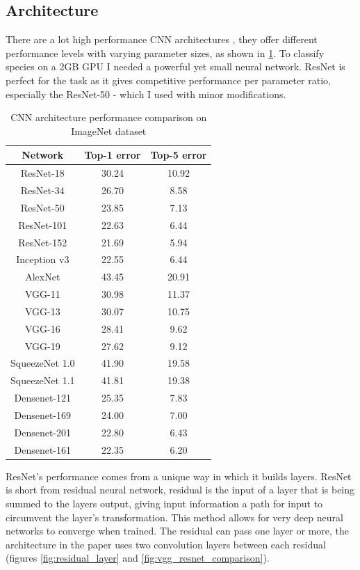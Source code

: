 \documentclass[times, utf8, diplomski]{fer}
\begin{document}
\subsection{Architecture}
\label{se:architecture}

There are a lot high performance CNN architectures \citep{he_deep_2016, simonyan_very_2014, szegedy_going_2015}, they offer different performance levels with varying parameter sizes, as shown in \ref{tb:CNN_architecutre_performance}. To classify species on a 2GB GPU I needed a powerful yet small neural network. ResNet is perfect for the task as it gives competitive performance per parameter ratio, especially the ResNet-50 - which I used with minor modifications.

\begin{table}
\centering
\caption{CNN architecture performance comparison on ImageNet dataset}
\label{tb:CNN_architecutre_performance}
\begin{tabular}{|c|c|c|}
\hline 
Network	& Top-1 error & Top-5 error \\  \hline
ResNet-18 & 30.24 & 10.92 \\
ResNet-34 & 26.70 & 8.58 \\ 
ResNet-50 & 23.85 & 7.13 \\ 
ResNet-101 & 22.63 & 6.44 \\ 
ResNet-152 & 21.69 & 5.94 \\  \hline
Inception v3 & 22.55 & 6.44 \\  \hline
AlexNet & 43.45 & 20.91 \\  \hline
VGG-11 & 30.98 & 11.37 \\ 
VGG-13 & 30.07 & 10.75 \\ 
VGG-16 & 28.41 & 9.62 \\ 
VGG-19 & 27.62 & 9.12 \\  \hline
SqueezeNet 1.0 & 41.90 & 19.58 \\ 
SqueezeNet 1.1 & 41.81 & 19.38 \\  \hline
Densenet-121 & 25.35 & 7.83 \\ 
Densenet-169 & 24.00 & 7.00 \\ 
Densenet-201 & 22.80 & 6.43 \\ 
Densenet-161 & 22.35 & 6.20 \\ 
\hline 
\end{tabular} 
\end{table}


ResNet's performance comes from a unique way in which it builds layers. ResNet is short from residual neural network, residual is the input of a layer that is being summed to the layers output, giving input information a path for input to circumvent the layer's transformation. This method allows for very deep neural networks to converge when trained. The residual can pass one layer or more, the architecture in the paper uses two convolution layers between each residual (figures \ref{fig:residual_layer} and \ref{fig:vgg_resnet_comparison}).
\end{document}
